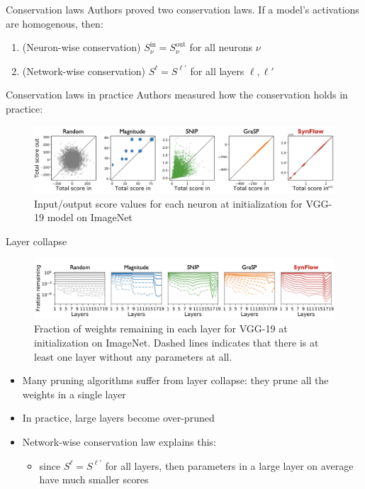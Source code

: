 \documentclass[10pt, handout]{beamer}
\begin{document}
\begin{frame}{Conservation laws}
Authors proved two conservation laws.
If a model's activations are homogenous, then:
    \begin{enumerate}
        \pause\item (Neuron-wise conservation) $S_\nu^\text{in} = S_\nu^\text{out}$ for all neurons $\nu$
        \pause\item (Network-wise conservation) $S^{\ell} = S^{\ell'}$ for all layers $\ell, \ell'$
    \end{enumerate}
\end{frame}


\begin{frame}{Conservation laws in practice}
    Authors measured how the conservation holds in practice:
    \begin{figure}
        \centering
        \includegraphics[width=\textwidth]{images/neuron-wise-conservation.png}
        \caption{Input/output score values for each neuron at initialization for VGG-19 model on ImageNet}
        \label{fig:neuron-wise-conservation}
    \end{figure}
\end{frame}


\begin{frame}{Layer collapse}

\begin{figure}
    \centering
    \includegraphics[width=\textwidth]{images/layer-collapse.png}
    \caption{Fraction of weights remaining in each layer for VGG-19 at initialization on ImageNet. Dashed lines indicates that there is at least one layer without any parameters at all.}
    \label{fig:layer-collapse}
\end{figure}
\begin{itemize}
    \item Many pruning algorithms suffer from layer collapse: they prune all the weights in a single layer
    \pause\item In practice, large layers become over-pruned
    \pause\item Network-wise conservation law explains this:
    \begin{itemize}
        \pause\item since $S^\ell = S^{\ell'}$ for all layers, then parameters in a large layer on average have much smaller scores
    \end{itemize}
\end{itemize}
\end{frame}
\end{document}
